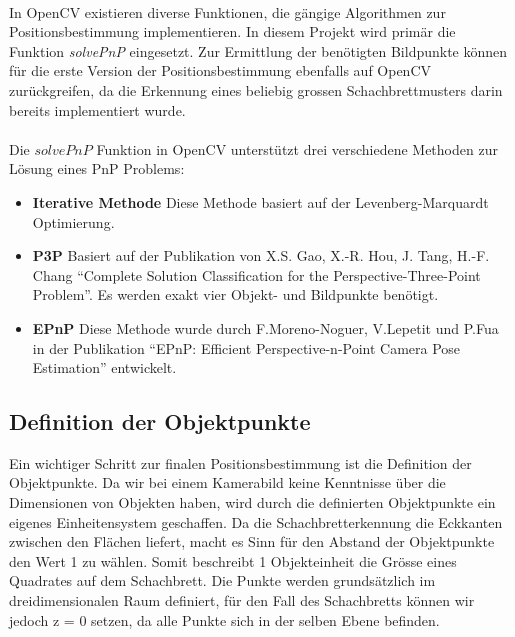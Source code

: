 \paragraph{}
In OpenCV existieren diverse Funktionen, die gängige Algorithmen zur Positionsbestimmung implementieren. In diesem Projekt wird primär die Funktion \textit{solvePnP} eingesetzt.  Zur Ermittlung der benötigten Bildpunkte können für die erste Version der Positionsbestimmung ebenfalls auf OpenCV zurückgreifen, da die Erkennung eines beliebig grossen Schachbrettmusters  darin bereits implementiert wurde. 

\paragraph{}
Die $solvePnP$ Funktion in OpenCV unterstützt drei verschiedene Methoden zur Lösung eines PnP Problems:

\begin{itemize}

\item \textbf{Iterative Methode}
Diese Methode basiert auf der Levenberg-Marquardt Optimierung.

\item \textbf{P3P}
Basiert auf der Publikation von X.S. Gao, X.-R. Hou, J. Tang, H.-F. Chang ``Complete Solution Classification for the Perspective-Three-Point Problem''. Es werden exakt vier Objekt- und Bildpunkte benötigt.

\item \textbf{EPnP}
Diese Methode wurde durch F.Moreno-Noguer, V.Lepetit und P.Fua in der Publikation ``EPnP: Efficient Perspective-n-Point Camera Pose Estimation'' entwickelt.

\end{itemize}


\subsection{Definition der Objektpunkte}

Ein wichtiger Schritt zur finalen Positionsbestimmung ist die Definition der Objektpunkte. Da wir bei einem Kamerabild keine Kenntnisse über die Dimensionen von Objekten haben, wird durch die definierten Objektpunkte ein eigenes Einheitensystem geschaffen. Da die Schachbretterkennung die Eckkanten zwischen den Flächen liefert, macht es Sinn für den Abstand der Objektpunkte den Wert 1 zu wählen. Somit beschreibt 1 Objekteinheit die Grösse eines Quadrates auf dem Schachbrett. Die Punkte werden grundsätzlich im dreidimensionalen Raum definiert, für den Fall des Schachbretts können wir jedoch z = 0 setzen, da alle Punkte sich in der selben Ebene befinden.

